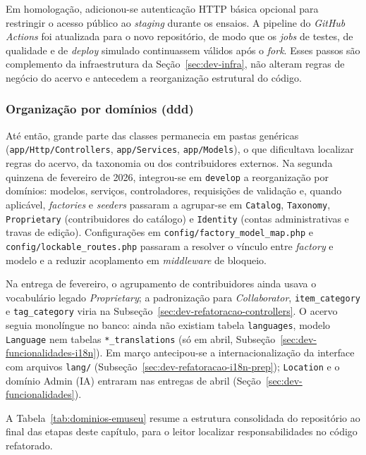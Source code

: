 Em homologação, adicionou-se autenticação HTTP básica opcional para restringir o acesso público ao \textit{staging} durante os ensaios. A pipeline do \textit{GitHub Actions} foi atualizada para o novo repositório, de modo que os \textit{jobs} de testes, de qualidade e de \textit{deploy} simulado continuassem válidos após o \textit{fork}. Esses passos são complemento da infraestrutura da Seção~\ref{sec:dev-infra}, não alteram regras de negócio do acervo e antecedem a reorganização estrutural do código.


\subsubsection{Organização por domínios (\acrshort{ddd})}\label{sec:dev-ddd}

Até então, grande parte das classes permanecia em pastas genéricas (\texttt{app/Http/Controllers}, \texttt{app/Services}, \texttt{app/Models}), o que dificultava localizar regras do acervo, da taxonomia ou dos contribuidores externos. Na segunda quinzena de fevereiro de 2026, integrou-se em \texttt{develop} a reorganização por domínios: modelos, serviços, controladores, requisições de validação e, quando aplicável, \textit{factories} e \textit{seeders} passaram a agrupar-se em \texttt{Catalog}, \texttt{Taxonomy}, \texttt{Proprietary} (contribuidores do catálogo) e \texttt{Identity} (contas administrativas e travas de edição). Configurações em \texttt{config/factory\_model\_map.php} e \texttt{config/lockable\_routes.php} passaram a resolver o vínculo entre \textit{factory} e modelo e a reduzir acoplamento em \textit{middleware} de bloqueio.

Na entrega de fevereiro, o agrupamento de contribuidores ainda usava o vocabulário legado \textit{Proprietary}; a padronização para \textit{Collaborator}, \texttt{item\_category} e \texttt{tag\_category} viria na Subseção~\ref{sec:dev-refatoracao-controllers}. O acervo seguia monolíngue no banco: ainda não existiam tabela \texttt{languages}, modelo \texttt{Language} nem tabelas \texttt{*\_translations} (só em abril, Subseção~\ref{sec:dev-funcionalidades-i18n}). Em março antecipou-se a internacionalização da interface com arquivos \texttt{lang/} (Subseção~\ref{sec:dev-refatoracao-i18n-prep}); \texttt{Location} e o domínio Admin (IA) entraram nas entregas de abril (Seção~\ref{sec:dev-funcionalidades}).

A Tabela~\ref{tab:dominios-emuseu} resume a estrutura consolidada do repositório ao final das etapas deste capítulo, para o leitor localizar responsabilidades no código refatorado.

